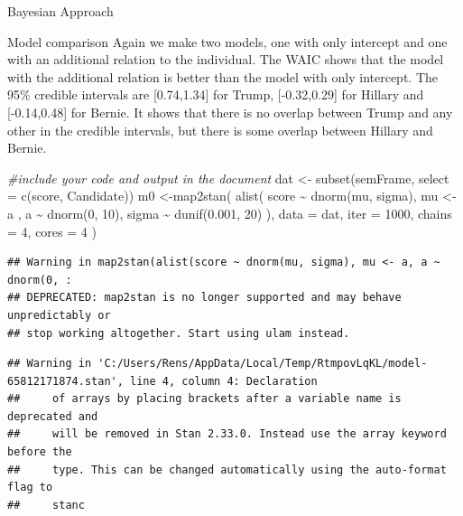 \documentclass[
  ignorenonframetext,
]{beamer}
\newenvironment{Shaded}{\begin{snugshade}}{\end{snugshade}}
\newcommand{\AttributeTok}[1]{\textcolor[rgb]{0.77,0.63,0.00}{#1}}
\newcommand{\CommentTok}[1]{\textcolor[rgb]{0.56,0.35,0.01}{\textit{#1}}}
\newcommand{\DecValTok}[1]{\textcolor[rgb]{0.00,0.00,0.81}{#1}}
\newcommand{\FloatTok}[1]{\textcolor[rgb]{0.00,0.00,0.81}{#1}}
\newcommand{\FunctionTok}[1]{\textcolor[rgb]{0.00,0.00,0.00}{#1}}
\newcommand{\NormalTok}[1]{#1}
\newcommand{\OtherTok}[1]{\textcolor[rgb]{0.56,0.35,0.01}{#1}}
\newcommand{\SpecialCharTok}[1]{\textcolor[rgb]{0.00,0.00,0.00}{#1}}
\begin{document}
\begin{frame}[fragile]{Bayesian Approach}
\begin{block}{Model comparison}
Again we make two models, one with only intercept and one with an
additional relation to the individual. The WAIC shows that the model
with the additional relation is better than the model with only
intercept. The 95\% credible intervals are {[}0.74,1.34{]} for Trump,
{[}-0.32,0.29{]} for Hillary and {[}-0.14,0.48{]} for Bernie. It shows
that there is no overlap between Trump and any other in the credible
intervals, but there is some overlap between Hillary and Bernie.

\begin{Shaded}
\begin{Highlighting}[]
\CommentTok{\#include your code and output in the document}
\NormalTok{dat }\OtherTok{\textless{}{-}} \FunctionTok{subset}\NormalTok{(semFrame, }\AttributeTok{select =} \FunctionTok{c}\NormalTok{(score, Candidate))}
\NormalTok{m0 }\OtherTok{\textless{}{-}}\FunctionTok{map2stan}\NormalTok{(}
  \FunctionTok{alist}\NormalTok{(}
\NormalTok{    score }\SpecialCharTok{\textasciitilde{}} \FunctionTok{dnorm}\NormalTok{(mu, sigma),}
\NormalTok{    mu }\OtherTok{\textless{}{-}}\NormalTok{ a ,}
\NormalTok{    a }\SpecialCharTok{\textasciitilde{}} \FunctionTok{dnorm}\NormalTok{(}\DecValTok{0}\NormalTok{, }\DecValTok{10}\NormalTok{),}
\NormalTok{    sigma }\SpecialCharTok{\textasciitilde{}} \FunctionTok{dunif}\NormalTok{(}\FloatTok{0.001}\NormalTok{, }\DecValTok{20}\NormalTok{)}
\NormalTok{  ), }\AttributeTok{data =}\NormalTok{ dat, }\AttributeTok{iter =} \DecValTok{1000}\NormalTok{, }\AttributeTok{chains =} \DecValTok{4}\NormalTok{, }\AttributeTok{cores =} \DecValTok{4}
\NormalTok{)}
\end{Highlighting}
\end{Shaded}

\begin{verbatim}
## Warning in map2stan(alist(score ~ dnorm(mu, sigma), mu <- a, a ~ dnorm(0, :
## DEPRECATED: map2stan is no longer supported and may behave unpredictably or
## stop working altogether. Start using ulam instead.
\end{verbatim}

\begin{verbatim}
## Warning in 'C:/Users/Rens/AppData/Local/Temp/RtmpovLqKL/model-65812171874.stan', line 4, column 4: Declaration
##     of arrays by placing brackets after a variable name is deprecated and
##     will be removed in Stan 2.33.0. Instead use the array keyword before the
##     type. This can be changed automatically using the auto-format flag to
##     stanc
\end{verbatim}


\end{block}
\end{frame}
\end{document}

